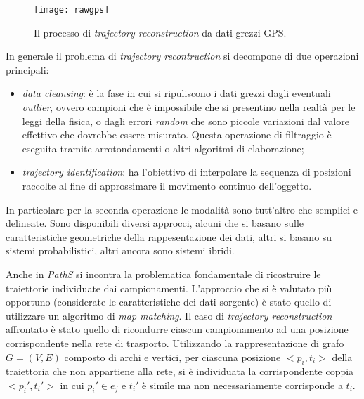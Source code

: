 \begin{figure}[h]
  \centering
  \texttt{[image: rawgps]}
  \caption{\footnotesize{Il processo di \emph{trajectory reconstruction} da dati grezzi GPS.}}
  \label{fig:rawgps}
\end{figure}

In generale il problema di \emph{trajectory recontruction} si decompone di due operazioni principali:
\begin{itemize}
\item \emph{data cleansing}: è la fase in cui si ripuliscono i dati grezzi dagli eventuali \emph{outlier}, ovvero campioni che è impossibile che si presentino nella realtà per le leggi della fisica, o dagli errori \emph{random} che sono piccole variazioni dal valore effettivo che dovrebbe essere misurato. Questa operazione di filtraggio è eseguita tramite arrotondamenti o altri algoritmi di elaborazione;
\item \emph{trajectory identification}: ha l'obiettivo di interpolare la sequenza di posizioni raccolte al fine di approssimare il movimento continuo dell'oggetto.
\end{itemize}
In particolare per la seconda operazione le modalità sono tutt'altro che semplici e delineate. Sono disponibili diversi approcci, alcuni che si basano sulle caratteristiche geometriche della rappesentazione dei dati, altri si basano su sistemi probabilistici, altri ancora sono sistemi ibridi.

Anche in \emph{PathS} si incontra la problematica fondamentale di ricostruire le traiettorie individuate dai campionamenti. L'approccio che si è valutato più opportuno (considerate le caratteristiche dei dati sorgente) è stato quello di utilizzare un algoritmo di \emph{map matching}.
Il caso di \emph{trajectory reconstruction} affrontato è stato quello di ricondurre ciascun campionamento ad una posizione corrispondente nella rete di trasporto. Utilizzando la rappresentazione di grafo $G=(V,E)$ composto di archi e vertici, per ciascuna posizione $<p_i, t_i>$ della traiettoria che non appartiene alla rete, si è individuata la corrispondente coppia $<p_i', t_i'>$ in cui $p_i' \in e_j$ e $t_i'$ è simile ma non necessariamente corrisponde a $t_i$.

